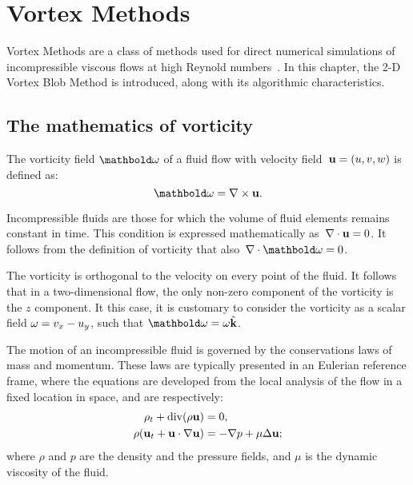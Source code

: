\chapter{Vortex Methods}
\label{ch:vm}

Vortex Methods are a class of methods
used for direct numerical simulations
of incompressible viscous flows at high Reynold numbers~\cite{cottet00}.
In this chapter, the 2-D Vortex Blob Method is introduced,
along with its algorithmic characteristics.

\section{The mathematics of vorticity}
\label{sec:eqs-vort}

The vorticity field \(\mathbold\vort\)
of a fluid flow with velocity field~\(\mathbf u = (u, v, w)\)
is defined as:%
\begin{equation}
  \mathbold\vort = \nabla\times\vel.
\end{equation}

Incompressible fluids are those for which
the volume of fluid elements remains constant in time.
This condition is expressed mathematically as~\(\nabla\cdot\mathbf u = 0\).
It follows from the definition of vorticity that also~\(\nabla\cdot\mathbold\vort = 0\).

The vorticity is orthogonal to the velocity on every point of the fluid.
It follows that in a two-dimensional flow,
the only non-zero component of the vorticity is the \(z\) component. 
It this case, it is customary to consider the vorticity as a scalar field
\(\omega = v_x - u_y\)\footnotemark,
such that \(\mathbold\vort = \vort\hat{\vec k}\).


The motion of an incompressible fluid
is governed by the conservations laws of mass and momentum.
These laws are typically presented in an Eulerian reference frame,
where the equations are developed from the local analysis of the flow
in a fixed location in space, and are respectively:
\begin{align}
  \rho_t + \operatorname{div}(\rho\mathbf u) &= 0, \\
  \rho(\mathbf u_t + \mathbf u\cdot\nabla\mathbf u) &= -\nabla p + \mu\Delta\mathbf u;
\end{align}
where \(\rho\) and \(p\) are the density and the pressure fields,
and \(\mu\) is the dynamic viscosity of the fluid.

